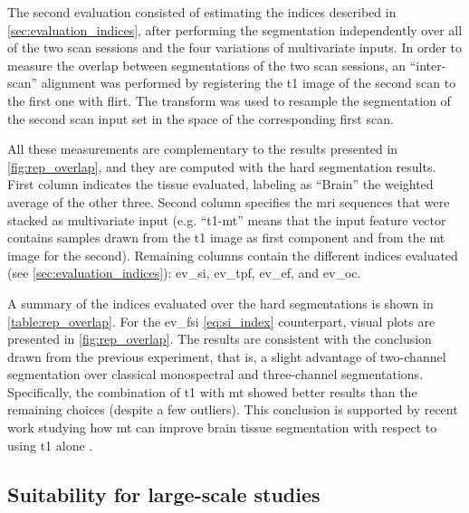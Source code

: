 The second evaluation consisted of estimating the indices described
  in \autoref{sec:evaluation_indices}, after performing the segmentation
  independently over all of the two scan sessions and the four variations of
  multivariate inputs.
In order to measure the overlap between segmentations of the two scan sessions,
  an ``inter-scan'' alignment was performed by registering the \gls*{t1} image
  of the second scan to the first one with \gls*{flirt}.
The transform was used to resample the segmentation of the second scan input set
  in the space of the corresponding first scan.
\begin{table*}[!htbp]
   \caption[Quantitative results for overlap repeatability experiment]{All these measurements 
   are complementary to the results presented in \autoref{fig:rep_overlap}, and they are 
   computed with the hard segmentation results.
   First column indicates the tissue evaluated, labeling as ``Brain'' the weighted average
   of the other three.
   Second column specifies the \gls*{mri} sequences that were stacked as multivariate input
   (e.g. ``\gls*{t1}-\gls*{mt}'' means that the input feature vector contains samples drawn
   from the \gls*{t1} image as first component and from the \gls*{mt} image for the second).
   Remaining columns contain the different indices evaluated (see \autoref{sec:evaluation_indices}):
   \acrfull*{ev_si}, \acrfull*{ev_tpf}, \acrfull*{ev_ef}, and \acrfull*{ev_oc}.\label{table:rep_overlap}}
   \centering\footnotesize{}
   
\end{table*}
A summary of the indices evaluated over the hard segmentations is shown
  in \autoref{table:rep_overlap}.
For the \gls*{ev_fsi} \eqref{eq:si_index} counterpart, visual plots are presented
  in \autoref{fig:rep_overlap}.
The results are consistent with the conclusion drawn from the previous experiment,
  that is, a slight advantage of two-channel segmentation over classical monospectral
  and three-channel segmentations.
Specifically, the combination of  \gls*{t1} with \gls*{mt} showed better results than
  the remaining choices (despite a few outliers).
This conclusion is supported by recent work studying how \gls*{mt} can improve brain tissue
  segmentation with respect to using \gls*{t1} alone \citep{helms_improved_2009}.


\subsection{Suitability for large-scale studies}
\label{sec:ixi}

